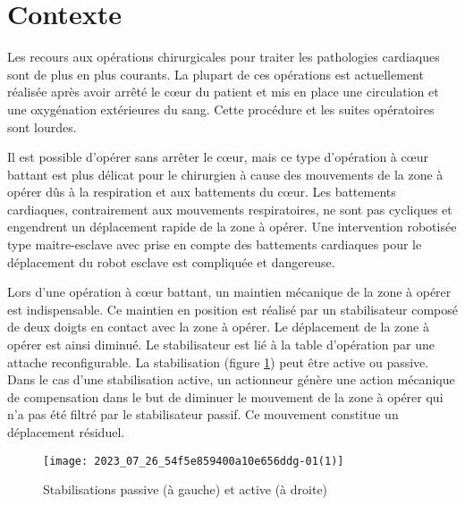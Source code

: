 %
%
%
%
%

\section*{Contexte}
Les recours aux opérations chirurgicales pour traiter les pathologies cardiaques sont de plus en plus courants. La plupart de ces opérations est actuellement réalisée après avoir arrêté le cœur du patient et mis en place une circulation et une oxygénation extérieures du sang. Cette procédure et les suites opératoires sont lourdes.

Il est possible d'opérer sans arrêter le cœur, mais ce type d'opération à cœur battant est plus délicat pour le chirurgien à cause des mouvements de la zone à opérer dûs à la respiration et aux battements du cœur. Les battements cardiaques, contrairement aux mouvements respiratoires, ne sont pas cycliques et engendrent un déplacement rapide de la zone à opérer. Une intervention robotisée type maitre-esclave avec prise en compte des battements cardiaques pour le déplacement du robot esclave est compliquée et dangereuse.

Lors d'une opération à cœur battant, un maintien mécanique de la zone à opérer est indispensable. Ce maintien en position est réalisé par un stabilisateur composé de deux doigts en contact avec la zone à opérer. Le déplacement de la zone à opérer est ainsi diminué. Le stabilisateur est lié à la table d'opération par une attache reconfigurable. La stabilisation (figure \ref{fig:01}) peut être active ou passive. Dans le cas d'une stabilisation active, un actionneur génère une action mécanique de compensation dans le but de diminuer le mouvement de la zone à opérer qui n'a pas été filtré par le stabilisateur passif. Ce mouvement constitue un déplacement résiduel.
\begin{figure}[!h]
\centering
\texttt{[image: 2023\_07\_26\_54f5e859400a10e656ddg-01(1)]}
\caption{Stabilisations passive (à gauche) et active (à droite) \label{fig:01}}
\end{figure}

